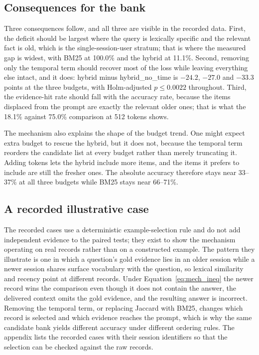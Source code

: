 \subsection{Consequences for the bank}

\label{sec:mech_consequences}

Three consequences follow, and all three are visible in the recorded data. First, the
deficit should be largest where the query is lexically specific and the relevant fact is
old, which is the single-session-user stratum; that is where the measured gap is widest,
with BM25 at 100.0\% and the hybrid at 11.1\%. Second, removing only the temporal term
should recover most of the loss while leaving everything else intact, and it does:
hybrid minus hybrid\_no\_time is $-24.2$, $-27.0$ and $-33.3$ points at the three
budgets, with Holm-adjusted $p\le 0.0022$ throughout. Third, the evidence-hit rate
should fall with the accuracy rate, because the items displaced from the prompt are
exactly the relevant older ones; that is what the 18.1\% against 75.0\% comparison at
512 tokens shows.

The mechanism also explains the shape of the budget trend. One might expect extra
budget to rescue the hybrid, but it does not, because the temporal term reorders the
candidate list at every budget rather than merely truncating it. Adding tokens lets the
hybrid include more items, and the items it prefers to include are still the fresher
ones. The absolute accuracy therefore stays near 33--37\% at all three budgets while
BM25 stays near 66--71\%.

\FloatBarrier

\subsection{A recorded illustrative case}

\label{sec:mech_case}

The recorded cases use a deterministic example-selection rule and do not add
independent evidence to the paired tests; they exist to show the mechanism operating on
real records rather than on a constructed example. The pattern they illustrate is one in
which a question's gold evidence lies in an older session while a newer session shares
surface vocabulary with the question, so lexical similarity and recency point at
different records. Under Equation~\ref{eq:mech_ineq} the newer record wins the
comparison even though it does not contain the answer, the delivered context omits the
gold evidence, and the resulting answer is incorrect. Removing the temporal term, or
replacing Jaccard with BM25, changes which record is selected and which evidence reaches
the prompt, which is why the same candidate bank yields different accuracy under
different ordering rules. The appendix lists the recorded cases with their session
identifiers so that the selection can be checked against the raw records.

